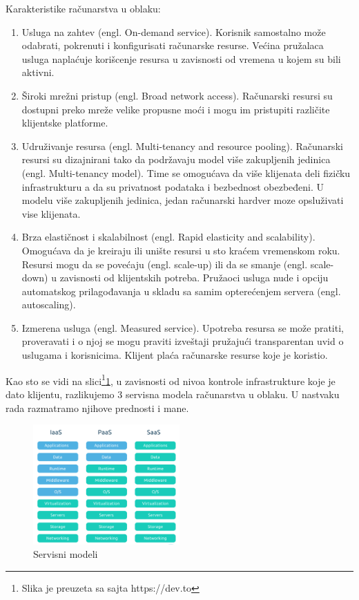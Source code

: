 \documentclass[12pt,oneside]{memoir}
\begin{document}
Karakteristike računarstva u oblaku:
\begin{enumerate}
  \item Usluga na zahtev (engl. On-demand service). Korisnik samostalno može odabrati, pokrenuti i konfigurisati računarske resurse. Većina pružalaca usluga naplaćuje korišcenje resursa u zavisnosti od vremena u kojem su bili aktivni.
  \item Široki mrežni pristup (engl. Broad network access). Računarski resursi su dostupni preko mreže velike propusne moći i mogu im pristupiti različite klijentske platforme.
  \item Udruživanje resursa (engl. Multi-tenancy and resource pooling). Računarski resursi su dizajnirani tako da podržavaju model više zakupljenih jedinica (engl. Multi-tenancy model). Time se omogućava da više klijenata deli fizičku infrastrukturu a da su privatnost podataka i bezbednost obezbeđeni. U modelu više zakupljenih jedinica, jedan računarski hardver moze opsluživati vise klijenata.
  \item Brza elastičnost i skalabilnost (engl. Rapid elasticity and scalability). Omogućava da je kreiraju ili unište resursi u sto kraćem vremenskom roku. Resursi mogu da se povećaju (engl. scale-up) ili da se smanje (engl. scale-down) u zavisnosti od klijentskih potreba. Pružaoci usluga nude i opciju automatskog prilagođavanja u skladu sa samim opterećenjem servera (engl. autoscaling).
  \item Izmerena usluga (engl. Measured service). Upotreba resursa se može pratiti, proveravati i o njoj se mogu praviti izveštaji pružajući transparentan uvid o uslugama i korisnicima. Klijent plaća računarske resurse koje je koristio.
\end{enumerate}

Kao sto se vidi na slici\footnote{Slika je preuzeta sa sajta https://dev.to}\ref{fig:servisniModeli}, u zavisnosti od nivoa kontrole infrastrukture koje je dato klijentu, razlikujemo 3 servisna modela računarstva u oblaku. U nastvaku rada razmatramo njihove prednosti i mane.

\begin{figure}[!ht]
  \centering
  \includegraphics[width=0.5\textwidth]{Slika 5.png}
  \caption{Servisni modeli}
  \label{fig:servisniModeli}
\end{figure}
 
\end{document}
